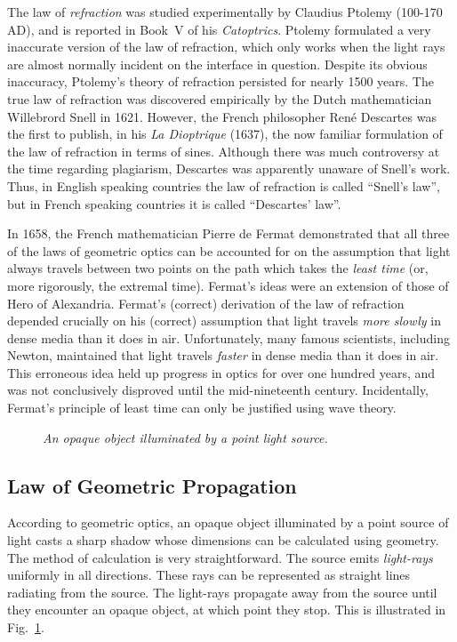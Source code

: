 The law of {\em refraction}\/ was studied experimentally by Claudius Ptolemy
(100-170\,AD), and is reported in Book~V of his {\em Catoptrics}.
 Ptolemy formulated a very inaccurate 
version of
the law of refraction, which only works when the light rays are almost
 normally
incident on the interface in question. Despite its obvious inaccuracy,
 Ptolemy's
theory of refraction persisted for nearly 1500 years. 
The true law of refraction was discovered empirically by the Dutch
mathematician  Willebrord Snell in 1621. However, the French philosopher
Ren\'{e} Descartes was the first to publish, in his
{\em La Dioptrique} (1637), the now familiar
formulation of the law of refraction in terms of sines. Although  there was much controversy at 
the time  regarding plagiarism, Descartes was apparently unaware of
Snell's work.
Thus, in English speaking countries the law
of refraction is called ``Snell's law'', but in French speaking
 countries
it is called ``Descartes' law''.

In 1658, the French mathematician Pierre de Fermat demonstrated that all
three of the laws of geometric optics can be accounted for
 on the 
assumption  
that
light always travels between two points on the path which takes the 
{\em least time}\/ (or, more
rigorously, the extremal time). Fermat's ideas were an extension of those of Hero of
Alexandria. Fermat's (correct) derivation of the law of refraction 
depended crucially
on his (correct) assumption that light travels {\em more slowly}\/ in dense 
media than it
does in air. Unfortunately, many famous scientists, 
including Newton, maintained
 that
light travels {\em faster}\/ in dense media than it does in air. This
erroneous idea held
up progress in optics for over one hundred years, and
 was not conclusively disproved until the mid-nineteenth 
century. 
Incidentally, 
Fermat's principle of least time can only  be justified 
 using
wave theory.

\begin{figure}
\epsfysize=3in
\centerline{}
\caption{\em An opaque object illuminated by a point light source.}\label{f12.1}
\end{figure}

\subsection{Law of Geometric Propagation}
According to geometric optics, an opaque object
illuminated by a point source of light casts a sharp shadow
whose dimensions can be calculated using geometry. The method
of calculation is very straightforward.
The source emits {\em light-rays} uniformly  in all directions.
These rays can be represented as straight lines radiating 
from the source. The light-rays propagate away from
the source until they encounter an opaque object, at which point
they stop. This is illustrated in Fig.~\ref{f12.1}.

